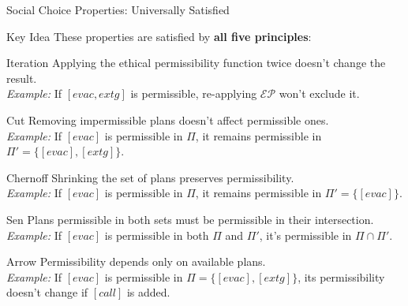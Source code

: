 \documentclass[compress,xcolor=table]{beamer}
\begin{document}
\begin{frame}{Social Choice Properties: Universally Satisfied}
    \begin{block}{Key Idea}
        These properties are satisfied by \textbf{all five principles}:
    \end{block}
    \tiny
    \begin{block}{Iteration}
        Applying the ethical permissibility function twice doesn't change the result.\\
        \textit{Example:} If $[evac, extg]$ is permissible, re-applying $\mathcal{EP}$ won't exclude it.
    \end{block}

    \begin{block}{Cut}
        Removing impermissible plans doesn't affect permissible ones.\\
        \textit{Example:} If $[evac]$ is permissible in $\Pi$, it remains permissible in $\Pi' = \{[evac], [extg]\}$.
    \end{block}

    \begin{block}{Chernoff}
        Shrinking the set of plans preserves permissibility.\\
        \textit{Example:} If $[evac]$ is permissible in $\Pi$, it remains permissible in $\Pi' = \{[evac]\}$.
    \end{block}

    \begin{block}{Sen}
        Plans permissible in both sets must be permissible in their intersection.\\
        \textit{Example:} If $[evac]$ is permissible in both $\Pi$ and $\Pi'$, it's permissible in $\Pi \cap \Pi'$.
    \end{block}

    \begin{block}{Arrow}
        Permissibility depends only on available plans.\\
        \textit{Example:} If $[evac]$ is permissible in $\Pi = \{[evac], [extg]\}$, its permissibility doesn't change if $[call]$ is added.
    \end{block}
\end{frame}
\end{document}
